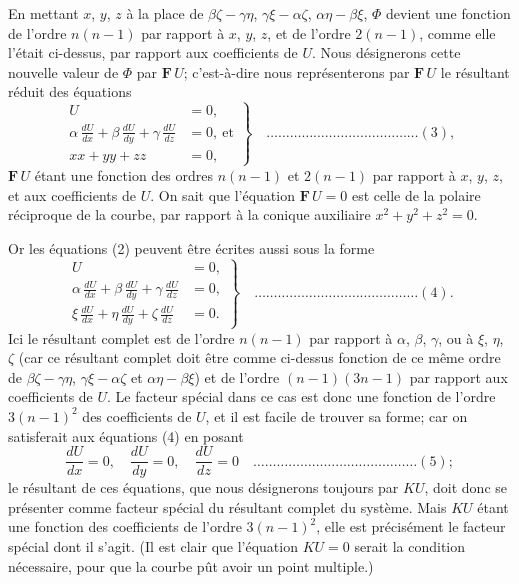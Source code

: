 \documentclass[11pt,a4paper]{book}
\begin{document}
En mettant $x$, $y$, $z$ \`a la place de $\beta\zeta - \gamma\eta$, $\gamma\xi - \alpha\zeta$, $\alpha\eta - \beta\xi$, $\Phi$ devient une fonction de l'ordre $n(n-1)$ par rapport \`a $x$, $y$, $z$, et de l'ordre $2(n-1)$, comme elle l'\'etait ci-dessus, par rapport aux coefficients de $U$. Nous d\'esignerons cette nouvelle valeur de $\Phi$ par $\mathbf{F}\,U$; c'est-\`a-dire nous repr\'esenterons par $\mathbf{F}\,U$ le r\'esultant r\'eduit des \'equations
\[
\left. \begin{aligned}
U &= 0, \\
\alpha\,\frac{dU}{dx} + \beta\,\frac{dU}{dy} + \gamma\,\frac{dU}{dz} &= 0, \ \text{et} \\
xx + yy + zz &= 0,
\end{aligned} \right\} \quad \ldots \ldots \ldots \ldots \ldots \ldots \ldots \ldots \ldots \ldots \ldots \ldots \ldots (3),
\]
$\mathbf{F}\,U$ \'etant une fonction des ordres $n(n-1)$ et $2(n-1)$ par rapport \`a $x$, $y$, $z$, et aux coefficients de $U$. On sait que l'\'equation $\mathbf{F}\,U = 0$ est celle de la polaire r\'eciproque de la courbe, par rapport \`a la conique auxiliaire $x^2 + y^2 + z^2 = 0$.

Or les \'equations (2) peuvent \^etre \'ecrites aussi sous la forme
\[
\left. \begin{aligned}
U &= 0, \\
\alpha\,\frac{dU}{dx} + \beta\,\frac{dU}{dy} + \gamma\,\frac{dU}{dz} &= 0, \\
\xi\,\frac{dU}{dx} + \eta\,\frac{dU}{dy} + \zeta\,\frac{dU}{dz} &= 0.
\end{aligned} \right\} \quad \ldots \ldots \ldots \ldots \ldots \ldots \ldots \ldots \ldots \ldots \ldots \ldots \ldots \ldots (4).
\]
Ici le r\'esultant complet est de l'ordre $n(n-1)$ par rapport \`a $\alpha$, $\beta$, $\gamma$, ou \`a $\xi$, $\eta$, $\zeta$ (car ce r\'esultant complet doit \^etre comme ci-dessus fonction de ce m\^eme ordre de $\beta\zeta - \gamma\eta$, $\gamma\xi - \alpha\zeta$ et $\alpha\eta - \beta\xi$) et de l'ordre $(n-1)(3n-1)$ par rapport aux coefficients de $U$. Le facteur sp\'ecial dans ce cas est donc une fonction de l'ordre $3(n-1)^2$ des coefficients de $U$, et il est facile de trouver sa forme; car on satisferait aux \'equations (4) en posant
\[
\frac{dU}{dx} = 0, \quad \frac{dU}{dy} = 0, \quad \frac{dU}{dz} = 0 \quad \ldots \ldots \ldots \ldots \ldots \ldots \ldots \ldots \ldots \ldots \ldots \ldots \ldots \ldots (5);
\]
le r\'esultant de ces \'equations, que nous d\'esignerons toujours par $\mathit{K}U$, doit donc se pr\'esenter comme facteur sp\'ecial du r\'esultant complet du syst\`eme. Mais $\mathit{K}U$ \'etant une fonction des coefficients de l'ordre $3(n-1)^2$, elle est pr\'ecis\'ement le facteur sp\'ecial dont il s'agit. (Il est clair que l'\'equation $\mathit{K}U = 0$ serait la condition n\'ecessaire, pour que la courbe p\^ut avoir un point multiple.)
\end{document}
